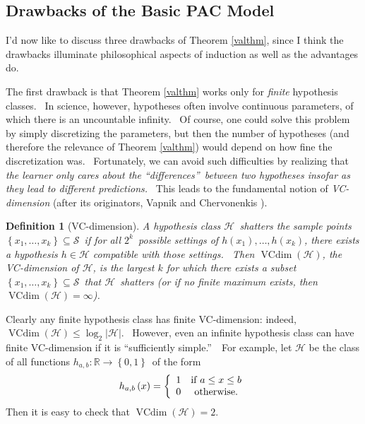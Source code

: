 \documentclass[12pt,onecolumn]{article}%
\newtheorem{definition}[theorem]{Definition}
\begin{document}
\subsection{Drawbacks of the Basic PAC Model\label{DRAWBACKS}}

I'd now like to discuss three drawbacks of Theorem \ref{valthm}, since I think
the drawbacks illuminate philosophical aspects of induction as well as the
advantages do.

The first drawback is that Theorem \ref{valthm} works only for \textit{finite}
hypothesis classes. \ In science, however, hypotheses often involve continuous
parameters, of which there is an uncountable infinity. \ Of course, one could
solve this problem by simply discretizing the parameters, but then the number
of hypotheses (and therefore the relevance of Theorem \ref{valthm}) would
depend on how fine the discretization was. \ Fortunately, we can avoid such
difficulties by realizing that \textit{the learner only cares about the
\textquotedblleft differences\textquotedblright\ between two hypotheses
insofar as they lead to different predictions.} \ This leads to the
fundamental notion of \textit{VC-dimension} (after its originators, Vapnik and
Chervonenkis \cite{vc}).

\begin{definition}
[VC-dimension]A hypothesis class $\mathcal{H}$\ shatters the sample points
$\left\{  x_{1},\ldots,x_{k}\right\}  \subseteq\mathcal{S}$\ if for all
$2^{k}$\ possible settings of $h\left(  x_{1}\right)  ,\ldots,h\left(
x_{k}\right)  $, there exists a hypothesis $h\in\mathcal{H}$ compatible with
those settings. \ Then $\operatorname*{VCdim}\left(  \mathcal{H}\right)  $,
the VC-dimension of $\mathcal{H}$, is the largest $k$ for which there exists a
subset $\left\{  x_{1},\ldots,x_{k}\right\}  \subseteq\mathcal{S}$\ that
$\mathcal{H}$\ shatters (or if no finite maximum exists, then
$\operatorname*{VCdim}\left(  \mathcal{H}\right)  =\infty$).
\end{definition}

Clearly any finite hypothesis class has finite VC-dimension: indeed,
$\operatorname*{VCdim}\left(  \mathcal{H}\right)  \leq\log_{2}\left\vert
\mathcal{H}\right\vert $. \ However, even an infinite hypothesis class can
have finite VC-dimension if it is \textquotedblleft sufficiently
simple.\textquotedblright\ \ For example, let $\mathcal{H}$ be the class of
all functions $h_{a,b}:\mathbb{R}\rightarrow\left\{  0,1\right\}  $\ of the
form%
\[
h_{a,b}\left(  x\right)  =\left\{
\begin{array}
[c]{cc}%
1 & \text{if }a\leq x\leq b\\
0 & \text{otherwise.}%
\end{array}
\right.
\]
Then it is easy to check that $\operatorname*{VCdim}\left(  \mathcal{H}%
\right)  =2$.
\end{document}
